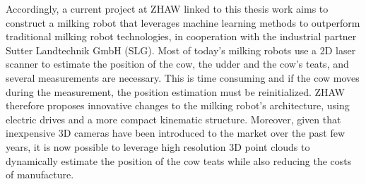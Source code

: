 

Accordingly, a current project at ZHAW linked to this thesis work aims to construct a milking robot that leverages machine learning methods to outperform traditional milking robot technologies, in cooperation with the industrial partner Sutter Landtechnik GmbH (SLG).
Most of today's milking robots use a 2D laser scanner to estimate the position of the cow, the udder and the cow's teats, and several measurements are necessary. This is time consuming and if the cow moves during the measurement, the position estimation must be reinitialized. ZHAW therefore proposes innovative changes to the milking robot's architecture, using electric drives and a more compact kinematic structure. Moreover, given that inexpensive 3D cameras have been introduced to the market over the past few years, it is now possible to leverage high resolution 3D point clouds to dynamically estimate the position of the cow teats while also reducing the costs of manufacture. 


